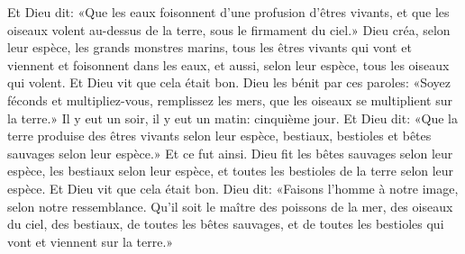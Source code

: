 Et Dieu dit:
	«Que les eaux foisonnent d’une profusion d’êtres vivants,
	et que les oiseaux volent au-dessus de la terre,
	sous le firmament du ciel.»
Dieu créa, selon leur espèce, les grands monstres marins,
	tous les êtres vivants qui vont et viennent et foisonnent dans les eaux,
	et aussi, selon leur espèce, tous les oiseaux qui volent.
	Et Dieu vit que cela était bon.
Dieu les bénit par ces paroles: «Soyez féconds et multipliez-vous,
	remplissez les mers, que les oiseaux se multiplient sur la terre.»
Il y eut un soir, il y eut un matin: cinquième jour.
Et Dieu dit: «Que la terre produise des êtres vivants selon leur espèce,
	bestiaux, bestioles et bêtes sauvages selon leur espèce.»
	Et ce fut ainsi.
Dieu fit les bêtes sauvages selon leur espèce, les bestiaux selon leur espèce,
	et toutes les bestioles de la terre selon leur espèce.
Et Dieu vit que cela était bon.
Dieu dit: «Faisons l’homme à notre image, selon notre ressemblance.
Qu’il soit le maître des poissons de la mer, des oiseaux du ciel,
	des bestiaux, de toutes les bêtes sauvages,
	et de toutes les bestioles qui vont et viennent sur la terre.»
